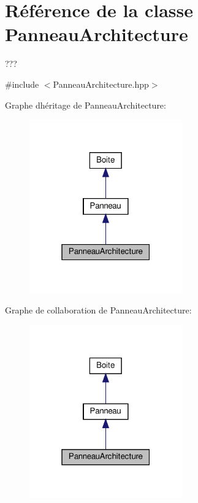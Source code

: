 \hypertarget{class_panneau_architecture}{}\section{Référence de la classe Panneau\+Architecture}
\label{class_panneau_architecture}


???  




{\ttfamily \#include $<$Panneau\+Architecture.\+hpp$>$}



Graphe d\textquotesingle{}héritage de Panneau\+Architecture\+:\nopagebreak
\begin{figure}[H]
\begin{center}
\leavevmode
\includegraphics[width=187pt]{class_panneau_architecture__inherit__graph}
\end{center}
\end{figure}


Graphe de collaboration de Panneau\+Architecture\+:\nopagebreak
\begin{figure}[H]
\begin{center}
\leavevmode
\includegraphics[width=187pt]{class_panneau_architecture__coll__graph}
\end{center}
\end{figure}
